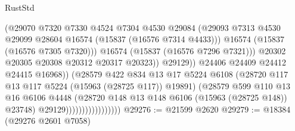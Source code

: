 \begin{lexlean}{RustStd}
\begin{coremodule}
                                                (@29070
                                                  @7320
                                                  @7330
                                                  @4524
                                                  @7304
                                                  @4530
                                                  @29084
                                                  (@29093
                                                    @7313
                                                    @4530
                                                    @29099
                                                    @28604
                                                    @16574
                                                    (@15837 (@16576 @7314 @4433)))
                                                  @16574
                                                  (@15837 (@16576 @7305 @7320)))
                                                @16574
                                                (@15837 (@16576 @7296 @7321)))
                                              @20302
                                              @20305
                                              @20308
                                              @20312
                                              @20317
                                              @20323))
                                          @29129))
                                      @24406
                                      @24409
                                      @24412
                                      @24415
                                      @16968))
                                  (@28579
                                    @422
                                    @834
                                    @13
                                    @17
                                    @5224
                                    @6108
                                    (@28720 @117 @13 @117 @5224 (@15963 (@28725 @117)) @19891)
                                    (@28579
                                      @599
                                      @110
                                      @13
                                      @16
                                      @6106
                                      @4448
                                      (@28720 @148 @13 @148 @6106 (@15963 (@28725 @148)) @23748)
                                      @29129)))))))))))))))))
@29276 := @21599 @2620
@29279 := @18384 (@29276 @2601 @7058)

\end{coremodule}
\end{lexlean}
